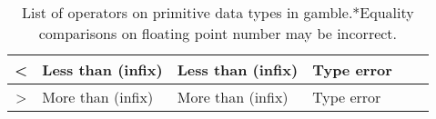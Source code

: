 \begin{table}[h]
\begin{tabular}{|c|l|l|l|l|l|}
    <                  & Less than (infix)                  & Less than (infix)                 & Type error             \\ \hline
    >                  & More than (infix)                  & More than (infix)                 & Type error             \\ \hline
    \end{tabular}
    \caption[List of operators on primitive data types in \gls{gamble}.]{List of operators on primitive data types in \gls{gamble}.\@*Equality comparisons on floating point number may be incorrect.}\label{tbl:operators}
\end{table}
